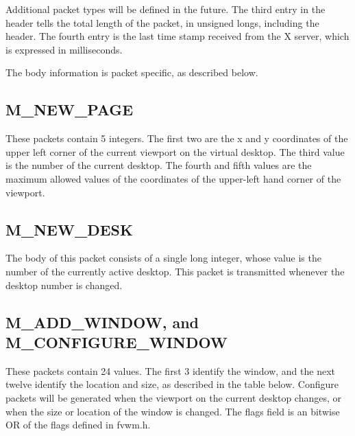 Additional packet types will be defined in the future. The third entry
in the header tells the total length of the packet, in unsigned longs,
including the header. The fourth entry is the last time stamp received
from the X server, which is expressed in milliseconds.

The body information is packet specific, as described below.
\subsection{M\_NEW\_PAGE}
These packets contain 5 integers. The first two are the x and y
coordinates of the upper left corner of the current viewport on the
virtual desktop. The third value is the number of the current desktop.
The fourth and fifth values are the maximum allowed values of the
coordinates of the upper-left hand corner of the viewport.

\subsection{M\_NEW\_DESK}
The body of this packet consists of a single long integer, whose value
is the number of the currently active desktop. This packet is
transmitted whenever the desktop number is changed.

\subsection{M\_ADD\_WINDOW, and M\_CONFIGURE\_WINDOW}
These packets contain 24 values. The first 3 identify the window, and
the next twelve identify the location and size, as described in the
table below. Configure packets will be generated when the
viewport on the current desktop changes, or when the size or location
of the window is changed. The flags field is an bitwise OR of the
flags defined in fvwm.h.


